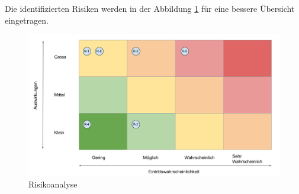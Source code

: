 Die identifizierten Risiken werden in der Abbildung \ref{fig:risikoanalyse} für eine bessere Übersicht eingetragen.
\begin{figure}[h!]
    \begin{center}
        \includegraphics[width=0.8\linewidth]{../common/03_billiard_ai/resources/16_risikoanalyse.png}
    \end{center}
    \caption{Risikoanalyse}
    \label{fig:risikoanalyse}
\end{figure}